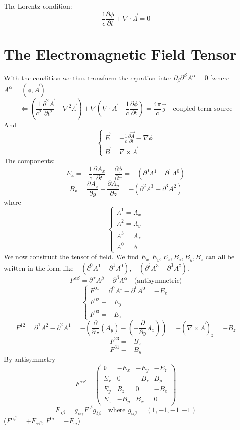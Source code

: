 \documentclass{article}
\begin{document}
	The Lorentz condition:
	\[ \frac{1}{c}\frac{\partial\phi}{\partial t} + \nabla \cdot \vec{A} = 0 \]
	
	\section{The Electromagnetic Field Tensor}
	
	With the condition we thus transform the equation into: $\partial_\beta \partial^\beta A^\alpha = 0$ [where $A^\alpha = (\phi, \vec{A})$]
	\[ \Leftarrow \left( \frac{1}{c^2}\frac{\partial^2\vec{A}}{\partial t^2} - \nabla^2\vec{A} \right) + \nabla(\nabla \cdot \vec{A} + \frac{1}{c}\frac{\partial\phi}{\partial t}) = \frac{4\pi}{c}\vec{j} \quad \text{coupled term source} \]
	And
	\[
	\begin{cases}
		\vec{E} = -\frac{1}{c}\frac{\partial\vec{A}}{\partial t} - \nabla\phi \\
		\vec{B} = \nabla \times \vec{A}
	\end{cases}
	\]
	The components:
	\[ E_x = -\frac{1}{c}\frac{\partial A_x}{\partial t} - \frac{\partial\phi}{\partial x} = -(\partial^0 A^1 - \partial^1 A^0) \]
	\[ B_x = \frac{\partial A_z}{\partial y} - \frac{\partial A_y}{\partial z} = -(\partial^2 A^3 - \partial^3 A^2) \]
	where
	\[
	\begin{cases}
		A^1 = A_x \\
		A^2 = A_y \\
		A^3 = A_z \\
		A^0 = \phi
	\end{cases}
	\]
	We now construct the tensor of field.
	We find $E_x, E_y, E_z, B_x, B_y, B_z$ can all be written in the form like $-(\partial^0 A^1 - \partial^1 A^0)$, $-(\partial^2 A^3 - \partial^3 A^2)$.
	\[ F^{\alpha\beta} = \partial^\alpha A^\beta - \partial^\beta A^\alpha \quad \text{(antisymmetric)} \]
	\[
	\begin{cases}
		F^{01} = \partial^0 A^1 - \partial^1 A^0 = -E_x \\
		F^{02} = -E_y \\
		F^{03} = -E_z
	\end{cases}
	\]
	\[ F^{12} = \partial^1 A^2 - \partial^2 A^1 = -(\frac{\partial}{\partial x}(A_y) - (-\frac{\partial}{\partial y}A_x)) = -(\nabla \times \vec{A})_z = -B_z \]
	\[ F^{23} = -B_x \]
	\[ F^{31} = -B_y \]
	By antisymmetry
	\[ F^{\alpha\beta} =
	\begin{pmatrix}
		0 & -E_x & -E_y & -E_z \\
		E_x & 0 & -B_z & B_y \\
		E_y & B_z & 0 & -B_x \\
		E_z & -B_y & B_x & 0
	\end{pmatrix}
	\]
	\[ F_{\alpha\beta} = g_{\alpha\gamma} F^{\gamma\delta} g_{\delta\beta} \quad \text{where } g_{\alpha\beta}=(1,-1,-1,-1) \]
	($F^{\alpha\beta} = +F_{\alpha\beta}$, $F^{0i} = -F_{0i}$)
	
\end{document}
